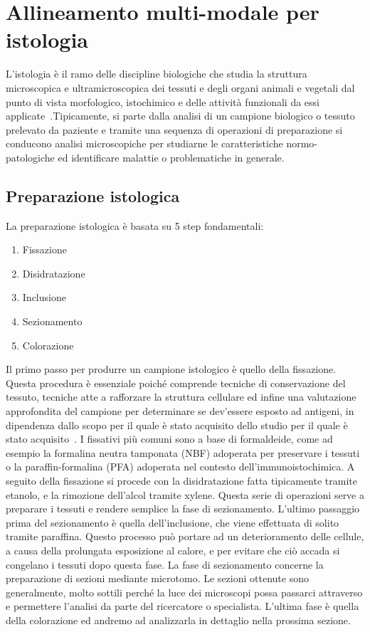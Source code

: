 \chapter{Allineamento multi-modale per istologia}
\frenchspacing
\label{chap:histology}
\noindent L'istologia è il ramo delle discipline biologiche che studia la struttura microscopica e ultramicroscopica dei tessuti e degli organi animali e vegetali dal punto di vista morfologico, istochimico e delle attività funzionali da essi applicate~\cite{Istologia}.Tipicamente, si parte dalla analisi di un campione biologico o tessuto prelevato da paziente e tramite una sequenza di operazioni di preparazione si conducono analisi microscopiche per studiarne le caratteristiche normo-patologiche ed identificare malattie o problematiche in generale.
\section{Preparazione istologica}
La preparazione istologica è basata su 5 step fondamentali:
\begin{enumerate}
    \item Fissazione
    \item Disidratazione
    \item Inclusione
    \item Sezionamento
    \item Colorazione
\end{enumerate} \hfill \break
\noindent Il primo passo per produrre un campione istologico è quello della fissazione. Questa procedura è essenziale poiché comprende tecniche di conservazione del tessuto, tecniche atte a rafforzare la struttura cellulare ed infine una valutazione approfondita del campione per determinare se dev'essere esposto ad antigeni, in dipendenza dallo scopo per il quale è stato acquisito dello studio per il quale è stato acquisito~\cite{Alturkistani2015-bz}. \hfill \break
\noindent I fissativi più comuni sono a base di formaldeide, come ad esempio la formalina neutra tamponata (NBF) adoperata per preservare i tessuti o la paraffin-formalina (PFA) adoperata nel contesto dell'immunoistochimica.
A seguito della fissazione si procede con la disidratazione fatta tipicamente tramite etanolo, e la rimozione dell'alcol tramite xylene. Questa serie di operazioni serve a preparare i tessuti e rendere semplice la fase di sezionamento. \hfill \break
\noindent L'ultimo passaggio prima del sezionamento è quella dell'inclusione, che viene effettuata di solito tramite paraffina. Questo processo può portare ad un deterioramento delle cellule, a causa della prolungata esposizione al calore, e per evitare che ciò accada si congelano i tessuti dopo questa fase. \hfill \break
\noindent La fase di sezionamento concerne la preparazione di sezioni mediante microtomo. Le sezioni ottenute sono generalmente, molto sottili perché la luce dei microscopi possa passarci attraverso e permettere l'analisi da parte del ricercatore o specialista.
L'ultima fase è quella della colorazione ed andremo ad analizzarla in dettaglio nella prossima sezione.
